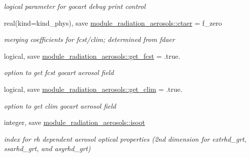 \begin{DoxyCompactItemize}
\begin{DoxyCompactList}\small\item\em logical parameter for gocart debug print control \end{DoxyCompactList}\item 
\mbox{\label{group__module__radiation__aerosols_ga4b0aa142aee31c40361dadc390ccc68e}} 
real(kind=kind\+\_\+phys), save \hyperlink{group__module__radiation__aerosols_ga4b0aa142aee31c40361dadc390ccc68e}{module\+\_\+radiation\+\_\+aerosols\+::ctaer} = f\+\_\+zero
\begin{DoxyCompactList}\small\item\em merging coefficients for fcst/clim; determined from fdaer \end{DoxyCompactList}\item 
\mbox{\label{group__module__radiation__aerosols_ga36f851e49de5e1f7da38da5fa6ea445c}} 
logical, save \hyperlink{group__module__radiation__aerosols_ga36f851e49de5e1f7da38da5fa6ea445c}{module\+\_\+radiation\+\_\+aerosols\+::get\+\_\+fcst} = .true.
\begin{DoxyCompactList}\small\item\em option to get fcst gocart aerosol field \end{DoxyCompactList}\item 
\mbox{\label{group__module__radiation__aerosols_ga7fe1943010fe47c9d86ef4c993848459}} 
logical, save \hyperlink{group__module__radiation__aerosols_ga7fe1943010fe47c9d86ef4c993848459}{module\+\_\+radiation\+\_\+aerosols\+::get\+\_\+clim} = .true.
\begin{DoxyCompactList}\small\item\em option to get clim gocart aerosol field \end{DoxyCompactList}\item 
\mbox{\label{group__module__radiation__aerosols_gaa9aa876f65d1e1e971607bff4ffbddad}} 
integer, save \hyperlink{group__module__radiation__aerosols_gaa9aa876f65d1e1e971607bff4ffbddad}{module\+\_\+radiation\+\_\+aerosols\+::isoot}
\begin{DoxyCompactList}\small\item\em index for rh dependent aerosol optical properties (2nd dimension for extrhd\+\_\+grt, ssarhd\+\_\+grt, and asyrhd\+\_\+grt) \end{DoxyCompactList}\item 

\end{DoxyCompactItemize}
